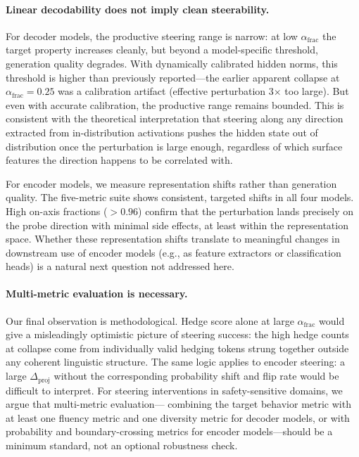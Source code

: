 \documentclass[11pt,a4paper]{article}
\begin{document}
\paragraph{Linear decodability does not imply clean steerability.}
For decoder models, the productive steering range is narrow: at low
$\alpha_{\mathrm{frac}}$ the target property increases cleanly, but
beyond a model-specific threshold, generation quality degrades. With
dynamically calibrated hidden norms, this threshold is higher than
previously reported---the earlier apparent collapse at
$\alpha_{\mathrm{frac}} = 0.25$ was a calibration artifact (effective
perturbation 3$\times$ too large). But even with accurate calibration,
the productive range remains bounded. This is consistent with the
theoretical interpretation that steering along any direction extracted
from in-distribution activations pushes the hidden state out of
distribution once the perturbation is large enough, regardless of which
surface features the direction happens to be correlated with.

For encoder models, we measure representation shifts rather than
generation quality. The five-metric suite shows consistent, targeted
shifts in all four models. High on-axis fractions ($>0.96$) confirm
that the perturbation lands precisely on the probe direction with
minimal side effects, at least within the representation space. Whether
these representation shifts translate to meaningful changes in downstream
use of encoder models (e.g., as feature extractors or classification
heads) is a natural next question not addressed here.

\paragraph{Multi-metric evaluation is necessary.}
Our final observation is methodological. Hedge score alone at large
$\alpha_{\mathrm{frac}}$ would give a misleadingly optimistic picture of
steering success: the high hedge counts at collapse come from
individually valid hedging tokens strung together outside any coherent
linguistic structure. The same logic applies to encoder steering: a
large $\Delta_{\text{proj}}$ without the corresponding probability shift
and flip rate would be difficult to interpret. For steering interventions
in safety-sensitive domains, we argue that multi-metric evaluation---
combining the target behavior metric with at least one fluency metric and
one diversity metric for decoder models, or with probability and
boundary-crossing metrics for encoder models---should be a minimum
standard, not an optional robustness check.
\end{document}
